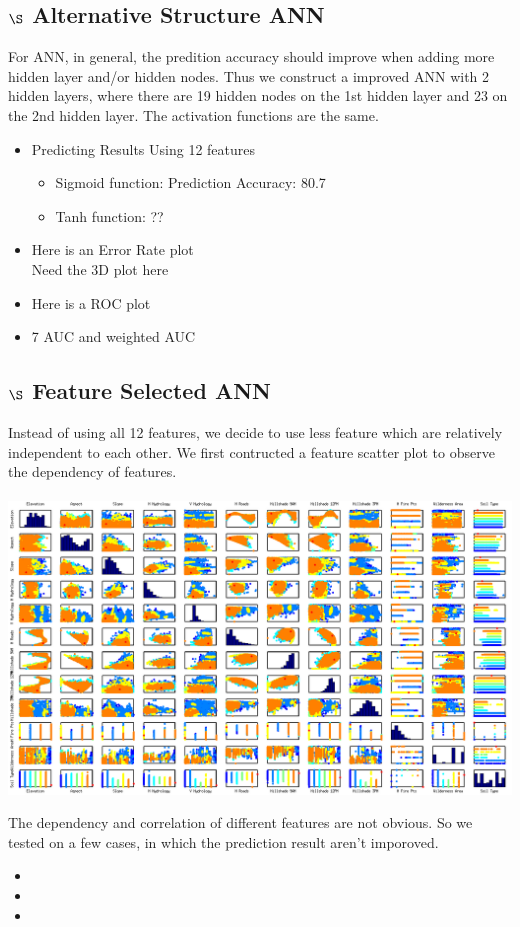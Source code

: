 \documentclass[11pt]{article}  %
\begin{document}
\subsection*{$\S$ Alternative Structure ANN}
For ANN, in general, the predition accuracy should improve when adding more hidden layer and/or hidden nodes. Thus we construct a improved ANN with 2 hidden layers, where there are 19 hidden nodes on the 1st hidden layer and 23 on the 2nd hidden layer. The activation functions are the same.
\begin{itemize}
\item Predicting Results Using 12 features
\begin{itemize}

\item Sigmoid function: Prediction Accuracy: 80.7%

\item Tanh function: ??

\end{itemize}
\item Here is an Error Rate plot\\
Need the 3D plot here


\item Here is a ROC plot

\item 7 AUC and weighted AUC
\end{itemize}

\subsection*{$\S$ Feature Selected ANN}
Instead of using all 12 features, we decide to use less feature which are relatively independent to each other. We first contructed a feature scatter plot to observe the dependency of features.\\
\\
\includegraphics[scale=0.4]{featureScatterPlotMatrixHD}


The dependency and correlation of different features are not obvious. So we tested on a few cases, in which the prediction result aren't imporoved.

\begin{itemize}
\item 
\item 
\item 


\end{itemize}
\end{document}
